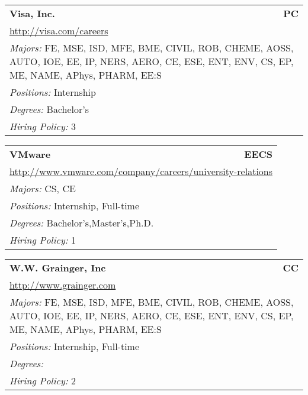 \documentclass[twoside]{article}
\begin{document}
\begin{center}
\begin{multicols}{3}
\begin{FlushLeft}
\begin{minipage}{.9\columnwidth}\begin{tabularx}{.95\columnwidth}{Xr}
                 {\Large\bf Visa, Inc.} & {\Large\bf PC}\\
    \multicolumn{2}{p{.95\columnwidth}}{\url{http://visa.com/careers}}\\
    \multicolumn{2}{p{.95\columnwidth}}{\emph{Majors:} FE, MSE, ISD, MFE, BME, CIVIL, ROB, CHEME, AOSS, AUTO, IOE, EE, IP, NERS, AERO, CE, ESE, ENT, ENV, CS, EP, ME, NAME, APhys, PHARM, EE:S}\\
    \multicolumn{2}{p{.95\columnwidth}}{\emph{Positions:} Internship}\\
    \multicolumn{2}{p{.95\columnwidth}}{\emph{Degrees:} Bachelor's}\\
    \multicolumn{2}{p{.95\columnwidth}}{\emph{Hiring Policy:} 3}\\
    \end{tabularx}
    
\end{minipage}
 
\begin{minipage}{.9\columnwidth}\begin{tabularx}{.95\columnwidth}{Xr}
                 {\Large\bf VMware} & {\Large\bf EECS}\\
    \multicolumn{2}{p{.95\columnwidth}}{\url{http://www.vmware.com/company/careers/university-relations}}\\
    \multicolumn{2}{p{.95\columnwidth}}{\emph{Majors:} CS, CE}\\
    \multicolumn{2}{p{.95\columnwidth}}{\emph{Positions:} Internship, Full-time}\\
    \multicolumn{2}{p{.95\columnwidth}}{\emph{Degrees:} Bachelor's,Master's,Ph.D.}\\
    \multicolumn{2}{p{.95\columnwidth}}{\emph{Hiring Policy:} 1}\\
    \end{tabularx}
    
\end{minipage}
 
\begin{minipage}{.9\columnwidth}\begin{tabularx}{.95\columnwidth}{Xr}
                 {\Large\bf W.W. Grainger, Inc} & {\Large\bf CC}\\
    \multicolumn{2}{p{.95\columnwidth}}{\url{http://www.grainger.com}}\\
    \multicolumn{2}{p{.95\columnwidth}}{\emph{Majors:} FE, MSE, ISD, MFE, BME, CIVIL, ROB, CHEME, AOSS, AUTO, IOE, EE, IP, NERS, AERO, CE, ESE, ENT, ENV, CS, EP, ME, NAME, APhys, PHARM, EE:S}\\
    \multicolumn{2}{p{.95\columnwidth}}{\emph{Positions:} Internship, Full-time}\\
    \multicolumn{2}{p{.95\columnwidth}}{\emph{Degrees:} }\\
    \multicolumn{2}{p{.95\columnwidth}}{\emph{Hiring Policy:} 2}\\
    \end{tabularx}
    

\end{minipage}
\end{FlushLeft}
\end{multicols}
\end{center}
\end{document}

